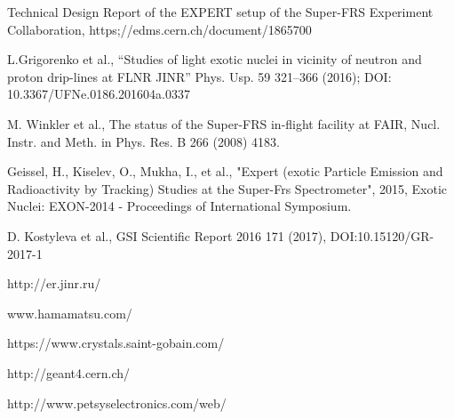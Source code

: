 \documentclass{webofc}
\begin{document}
	
\begin{thebibliography}{99}
	
	Technical Design Report of the EXPERT setup of the Super-FRS Experiment Collaboration, https;//edms.cern.ch/document/1865700
	
	L.Grigorenko et al., “Studies of light exotic nuclei in vicinity of neutron and proton drip-lines at FLNR JINR” Phys. Usp. 59 321–366 (2016); DOI: 10.3367/UFNe.0186.201604a.0337
	
	M. Winkler et al., The status of the Super-FRS in-flight facility at FAIR, Nucl. Instr. and Meth. in Phys. Res. B 266 (2008) 4183.
	
	Geissel, H., Kiselev, O., Mukha, I., et al., "Expert (exotic Particle Emission and Radioactivity by Tracking) Studies at the Super-Frs Spectrometer", 2015, Exotic Nuclei: EXON-2014 - Proceedings of International Symposium.
	
	D. Kostyleva et al., GSI Scientific Report 2016 171 (2017), DOI:10.15120/GR-2017-1
	
	http://er.jinr.ru/
	
	www.hamamatsu.com/
	
	https://www.crystals.saint-gobain.com/
	
	http://geant4.cern.ch/
	
	http://www.petsyselectronics.com/web/
	
\end{thebibliography}
\end{document}
